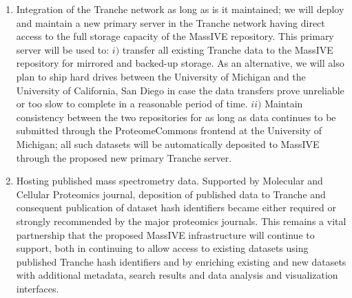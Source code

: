 \documentclass[arial,11pt]{article}
\begin{document}
\begin{enumerate}
\item Integration of the Tranche network as long as is it maintained; we will deploy and maintain a new primary server in the Tranche network having direct access to the full storage capacity of the MassIVE repository. This primary server will be used to: $i)$ transfer all existing Tranche data to the MassIVE repository for mirrored and backed-up storage. As an alternative, we will also plan to ship hard drives between the University of Michigan and the University of California, San Diego in case the data transfers prove unreliable or too slow to complete in a reasonable period of time. $ii)$ Maintain consistency between the two repositories for as long as data continues to be submitted through the ProteomeCommons frontend at the University of Michigan; all such datasets will be automatically deposited to MassIVE through the proposed new primary Tranche server.

%
\item Hosting published mass spectrometry data. Supported by Molecular and Cellular Proteomics journal, deposition of published data to Tranche and consequent publication of dataset hash identifiers became either required or strongly recommended by the major proteomics journals. This remains a vital partnership that the proposed MassIVE infrastructure will continue to support, both in continuing to allow access to existing datasets using published Tranche hash identifiers and by enriching existing and new datasets with additional metadata, search results and data analysis and visualization interfaces.
\end{enumerate}
\end{document}
